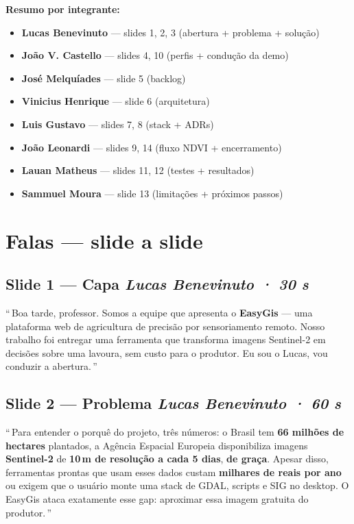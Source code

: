 \documentclass[12pt,a4paper]{article}
\begin{document}
\vspace{6pt}
\textbf{Resumo por integrante:}

\begin{itemize}
  \item \textbf{Lucas Benevinuto} — slides 1, 2, 3 (abertura + problema + solução)
  \item \textbf{João V. Castello} — slides 4, 10 (perfis + condução da demo)
  \item \textbf{José Melquíades} — slide 5 (backlog)
  \item \textbf{Vinicius Henrique} — slide 6 (arquitetura)
  \item \textbf{Luis Gustavo} — slides 7, 8 (stack + ADRs)
  \item \textbf{João Leonardi} — slides 9, 14 (fluxo NDVI + encerramento)
  \item \textbf{Lauan Matheus} — slides 11, 12 (testes + resultados)
  \item \textbf{Sammuel Moura} — slide 13 (limitações + próximos passos)
\end{itemize}

\newpage

\section*{Falas — slide a slide}

\subsection*{Slide 1 — Capa \hfill \textit{Lucas Benevinuto · 30 s}}

\textquotedblleft\,Boa tarde, professor. Somos a equipe que apresenta o
\textbf{EasyGis} — uma plataforma web de agricultura de precisão por
sensoriamento remoto. Nosso trabalho foi entregar uma ferramenta que
transforma imagens Sentinel-2 em decisões sobre uma lavoura, sem custo
para o produtor. Eu sou o Lucas, vou conduzir a abertura.\,\textquotedblright

\subsection*{Slide 2 — Problema \hfill \textit{Lucas Benevinuto · 60 s}}

\textquotedblleft\,Para entender o porquê do projeto, três números:
o Brasil tem \textbf{66 milhões de hectares} plantados, a Agência
Espacial Europeia disponibiliza imagens \textbf{Sentinel-2} de \textbf{10\,m
de resolução a cada 5 dias}, \textbf{de graça}. Apesar disso, ferramentas
prontas que usam esses dados custam \textbf{milhares de reais por ano}
ou exigem que o usuário monte uma stack de GDAL, scripts e SIG no
desktop. O EasyGis ataca exatamente esse gap: aproximar essa imagem
gratuita do produtor.\,\textquotedblright
\end{document}
